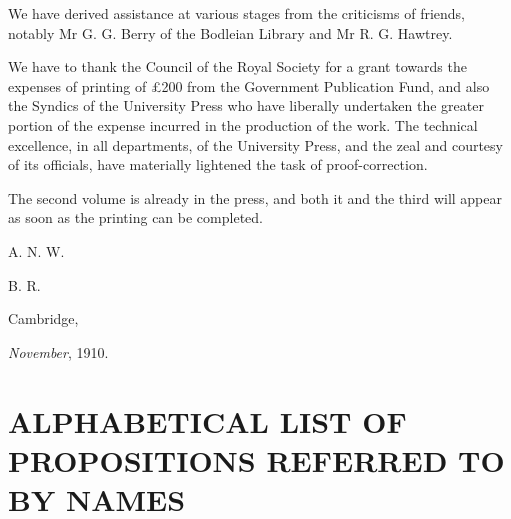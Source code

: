 \documentclass[letterpaper,12pt,openany,leqno]{book}
\begin{document}
We have derived assistance at various stages from the criticisms of friends, notably Mr G. G. Berry of the Bodleian Library and Mr R. G. Hawtrey.

We have to thank the Council of the Royal Society for a grant towards the expenses of printing of \pounds200 from the Government Publication Fund, and also the Syndics of the University Press who have liberally undertaken the greater portion of the expense incurred in the production of the work. The technical excellence, in all departments, of the University Press, and the zeal and courtesy of its officials, have materially lightened the task of proof-correction. 

The second volume is already in the press, and both it and the third will appear as soon as the printing can be completed.

\bigskip

\hspace{12cm} A. N. W. 

\smallskip

\hspace{12cm} B. R.

\bigskip \bigskip \bigskip \bigskip

Cambridge,

\smallskip

\hspace{20pt} \textit{November}, 1910.

\tableofcontents

\chapter*{\centering \Large ALPHABETICAL LIST OF PROPOSITIONS REFERRED TO BY NAMES} \thispagestyle{empty}
\end{document}
